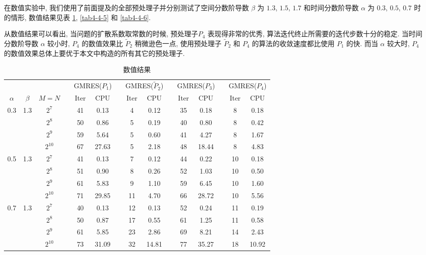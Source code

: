 \documentclass{ecnumaster}
\begin{document}
在数值实验中, 我们使用了前面提及的全部预处理子并分别测试了空间分数阶导数 $\beta$ 为 $1.3$, $1.5$, $1.7$
和时间分数阶导数 $\alpha$ 为 $0.3$, $0.5$, $0.7$ 时的情形,
数值结果见表 \ref{tab4-4-4}, \ref{tab4-4-5} 和 \ref{tab4-4-6}.

从数值结果可以看出,
当问题的扩散系数取常数的时候,
预处理子$P_4$ 表现得非常的优秀,
算法迭代终止所需要的迭代步数十分的稳定.
当时间分数阶导数 $\alpha$ 较小时,
$P_4$ 的数值效果比 $\tilde{P}_2$ 稍微逊色一点,
使用预处理子 $\tilde{P}_2$ 和 $P_4$ 的算法的收敛速度都比使用 $P_1$ 的快.
而当 $\alpha$ 较大时,
$P_4$ 的数值效果总体上要优于本文中构造的所有其它的预处理子.

\begin{table}[H]
\centering
\caption{数值结果} \label{tab4-4-4}\smallskip
\begin{tabular}{ccccccccccccccc} \toprule
& &  && \multicolumn{2}{c}{GMRES($P_1$)}
&& \multicolumn{2}{c}{GMRES($\tilde{P}_2$)}
&& \multicolumn{2}{c}{GMRES($P_3$)}
&& \multicolumn{2}{c}{GMRES($P_4$)} \\
$\alpha$ & $\beta$ & $M = N$ && Iter & CPU && Iter & CPU
&& Iter & CPU && Iter & CPU\\ \midrule
0.3 & 1.3
 & $2^7$     && 41 & 0.13 && 4 & 0.12 && 35 & 0.18 && 8 & 0.18 \\
&& $2^8$     && 50 & 0.86 && 5 & 0.19 && 40 & 0.80 && 8 & 0.42 \\
&& $2^9$     && 59 & 5.64 && 5 & 0.60 && 41 & 4.27 && 8 & 1.67 \\
&& $2^{10}$  && 67 & 27.63 && 5 & 2.18 && 48 & 18.44 && 8 & 4.83 \\ \midrule
0.5 & 1.3
 & $2^7$     && 41 & 0.13 && 7 & 0.12 && 44 & 0.22 && 10 & 0.18 \\
&& $2^8$     && 51 & 0.90 && 8 & 0.26 && 52 & 1.03 && 10 & 0.50  \\
&& $2^9$     && 61 & 5.83 && 9 & 1.10 && 59 & 6.45 && 10 & 1.60  \\
&& $2^{10}$  && 71 & 29.85 && 11 & 4.70 && 66 & 28.72 && 10 & 5.56  \\ \midrule
0.7 & 1.3
 & $2^7$     && 40 & 0.13 && 12 & 0.13 && 52 & 0.24 && 11 & 0.19  \\
&& $2^8$     && 50 & 0.87 && 17 & 0.55 && 61 & 1.25 && 11 & 0.58  \\
&& $2^9$     && 61 & 5.85 && 23 & 2.86 && 69 & 8.21 && 14 & 2.43  \\
&& $2^{10}$  && 73 &31.09 && 32 &14.81 && 77 &35.27 && 18 & 10.92  \\ \bottomrule
\end{tabular}
\end{table}
\end{document}
